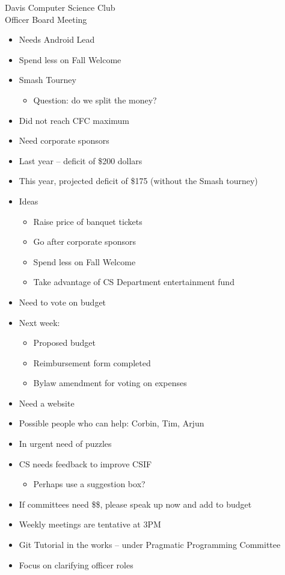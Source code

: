 \documentclass{article}
\begin{document}
\begin{Minutes}{Davis Computer Science Club\\Officer Board Meeting}
\begin {itemize}
\item Needs Android Lead
\end {itemize}
    
\begin {itemize}
\item Spend less on Fall Welcome
\item Smash Tourney
\begin {itemize}
    \item Question: do we split the money?
\end {itemize}
\item Did not reach CFC maximum
\item Need corporate sponsors
\item Last year -- deficit of \$200 dollars
\item This year, projected deficit of \$175 (without the Smash tourney)
\item Ideas
\begin{itemize}
    \item Raise price of banquet tickets
    \item Go after corporate sponsors   
    \item Spend less on Fall Welcome
    \item Take advantage of CS Department entertainment fund
\end{itemize}
\item Need to vote on budget
\item Next week:
\begin {itemize}
    \item Proposed budget
    \item Reimbursement form completed
    \item Bylaw amendment for voting on expenses
\end{itemize}
\end{itemize}

\begin{itemize}
\item Need a website
\item Possible people who can help: Corbin, Tim, Arjun
\item In urgent need of puzzles
\end{itemize}

\begin{itemize}
\item CS needs feedback to improve CSIF
\begin{itemize}
    \item Perhaps use a suggestion box?
\end{itemize}
\item If committees need \$\$, please speak up now and add to budget
\item Weekly meetings are tentative at 3PM
\item Git Tutorial in the works -- under Pragmatic Programming Committee
\item Focus on clarifying officer roles
\end{itemize}



\end{Minutes}
\end{document}
